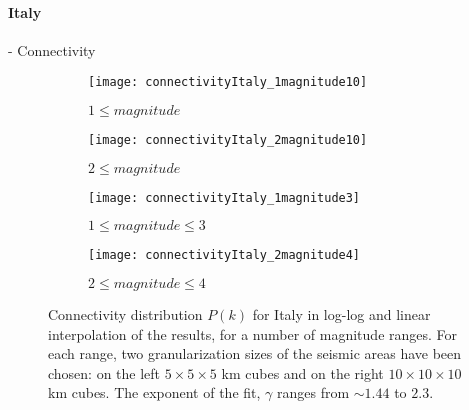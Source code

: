 \paragraph{Italy} - Connectivity
\begin{figure}[!h]
\begin{subfigure}{.99\textwidth}
  \centering
  \texttt{[image: connectivityItaly\_1magnitude10]}
  \caption{$1 \leq magnitude$}
  \label{fig:conIt1mag10}
\end{subfigure}%

\begin{subfigure}{.99\textwidth}
  \centering
  \texttt{[image: connectivityItaly\_2magnitude10]}
  \caption{$2\leq magnitude$}
  \label{fig:conIt2mag10}
\end{subfigure}%

\begin{subfigure}{.99\textwidth}
  \centering
  \texttt{[image: connectivityItaly\_1magnitude3]}
  \caption{$1 \leq magnitude \leq 3$}
  \label{fig:conIt1mag3}
\end{subfigure}%

\begin{subfigure}{.99\textwidth}
  \centering
  \texttt{[image: connectivityItaly\_2magnitude4]}
  \caption{$2 \leq magnitude \leq 4$}
  \label{fig:conIt2mag4}
\end{subfigure}%

\caption{Connectivity distribution $P(k)$ for Italy in log-log and linear interpolation of the results, for a number of magnitude ranges. For each range, two granularization sizes of the seismic areas have been chosen: on the left $5 \times 5 \times5 $ km cubes and on the right $10 \times 10 \times 10$ km cubes. The exponent of the fit, $\gamma$ ranges from $\sim 1.44$ to $2.3$.}
\label{fig:connectivityIt}
\end{figure}

\clearpage
